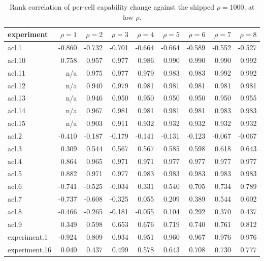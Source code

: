\begin{table}[htbp]
  \centering
  \caption{Rank correlation of per-cell capability change against the shipped $\rho=1000$, at low $\rho$.}
  \label{tab:rho-low-correlation}
  \begin{tabular}{l r r r r r r r r}
    \toprule
    experiment & $\rho=1$ & $\rho=2$ & $\rho=3$ & $\rho=4$ & $\rho=5$ & $\rho=6$ & $\rho=7$ & $\rho=8$ \\
    \midrule
    acl.1 & -0.860 & -0.732 & -0.701 & -0.664 & -0.664 & -0.589 & -0.552 & -0.527 \\
    acl.10 & 0.758 & 0.957 & 0.977 & 0.986 & 0.990 & 0.990 & 0.990 & 0.992 \\
    acl.11 & n/a & 0.975 & 0.977 & 0.979 & 0.983 & 0.983 & 0.992 & 0.992 \\
    acl.12 & n/a & 0.940 & 0.979 & 0.981 & 0.981 & 0.981 & 0.981 & 0.981 \\
    acl.13 & n/a & 0.946 & 0.950 & 0.950 & 0.950 & 0.950 & 0.950 & 0.955 \\
    acl.14 & n/a & 0.967 & 0.981 & 0.981 & 0.981 & 0.981 & 0.983 & 0.983 \\
    acl.15 & n/a & 0.903 & 0.911 & 0.932 & 0.932 & 0.932 & 0.932 & 0.932 \\
    acl.2 & -0.410 & -0.187 & -0.179 & -0.141 & -0.131 & -0.123 & -0.067 & -0.067 \\
    acl.3 & 0.309 & 0.544 & 0.567 & 0.567 & 0.585 & 0.598 & 0.618 & 0.643 \\
    acl.4 & 0.864 & 0.965 & 0.971 & 0.971 & 0.977 & 0.977 & 0.977 & 0.977 \\
    acl.5 & 0.882 & 0.971 & 0.977 & 0.983 & 0.983 & 0.983 & 0.983 & 0.983 \\
    acl.6 & -0.741 & -0.525 & -0.034 & 0.331 & 0.540 & 0.705 & 0.734 & 0.789 \\
    acl.7 & -0.737 & -0.608 & -0.325 & 0.055 & 0.209 & 0.389 & 0.544 & 0.602 \\
    acl.8 & -0.466 & -0.265 & -0.181 & -0.055 & 0.104 & 0.292 & 0.370 & 0.437 \\
    acl.9 & 0.349 & 0.598 & 0.653 & 0.676 & 0.719 & 0.740 & 0.761 & 0.812 \\
    experiment.1 & -0.924 & 0.809 & 0.934 & 0.951 & 0.960 & 0.967 & 0.976 & 0.976 \\
    experiment.16 & 0.040 & 0.437 & 0.499 & 0.578 & 0.643 & 0.708 & 0.730 & 0.777 \\

\end{tabular}
\end{table}
